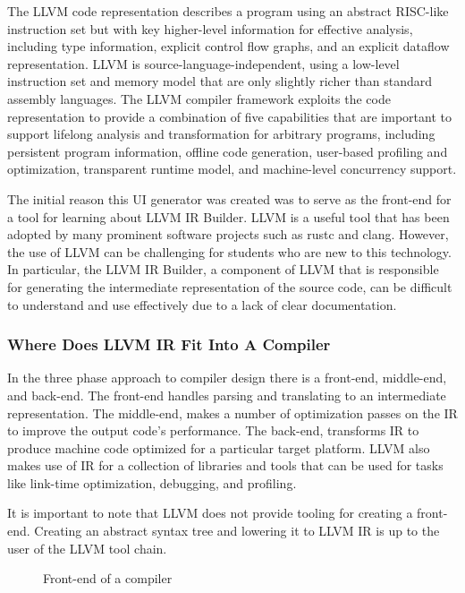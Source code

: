 \documentclass[hidelinks,12pt]{article}
\begin{document}
\begin{doublespacing}
The LLVM code representation describes a program using an abstract RISC-like instruction set but with key higher-level information for effective analysis, including type information, explicit control flow graphs, and an explicit dataflow representation. LLVM is source-language-independent, using a low-level instruction set and memory model that are only slightly richer than standard assembly languages. The LLVM compiler framework exploits the code representation to provide a combination of five capabilities that are important to support lifelong analysis and transformation for arbitrary programs, including persistent program information, offline code generation, user-based profiling and optimization, transparent runtime model, and machine-level concurrency support.
\cite{lattner_llvm_2004}

The initial reason this UI generator was created was to serve as the front-end for a tool for learning about LLVM IR Builder. LLVM is a useful tool that has been adopted by many prominent software projects such as rustc and clang. However, the use of LLVM can be challenging for students who are new to this technology. In particular, the LLVM IR Builder, a component of LLVM that is responsible for generating the intermediate representation of the source code, can be difficult to understand and use effectively due to a lack of clear documentation.

\subsubsection*{Where Does LLVM IR Fit Into A Compiler}
In the three phase approach to compiler design there is a front-end, middle-end, and back-end. The front-end handles parsing and translating to an intermediate representation. The middle-end, makes a number of optimization passes on the IR to improve the output code's performance. The back-end, transforms IR to produce machine code optimized for a particular target platform. LLVM also makes use of IR for a collection of libraries and tools that can be used for tasks like link-time optimization, debugging, and profiling.

It is important to note that LLVM does not provide tooling for creating a front-end. Creating an abstract syntax tree and lowering it to LLVM IR is up to the user of the LLVM tool chain. 

\begin{figure}[ht]
    \centering
    \caption{Front-end of a compiler}
\end{figure}
\end{doublespacing}
\end{document}
